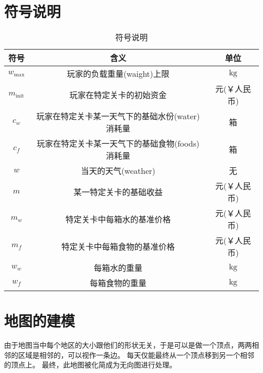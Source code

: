 \documentclass{cumcmthesis}
\begin{document}
\section{符号说明}
\begin{table}[H]
	\caption{符号说明}
	\centering
	\begin{tabular}{ccc}
		\toprule[1.5pt]
		符号                  & 含义                                                           & 单位          \\
		\midrule[1pt]
		$w_{\mathrm{max}}$    & \qquad\qquad\quad 玩家的负载重量(waight)上限\qquad\qquad\qquad & $\mathrm{kg}$ \\
		$ m_{\mathrm{init}} $ & 玩家在特定关卡的初始资金                                       & 元(￥人民币)  \\
		$ c_w $               & 玩家在特定关卡某一天气下的基础水份(water)消耗量                & 箱            \\
		$ c_f $               & 玩家在特定关卡某一天气下的基础食物(foods)消耗量                & 箱            \\
		$ w $                 & 当天的天气(weather)                                            & 无            \\
		$ m $                 & 某一特定关卡的基础收益                                         & 元(￥人民币)  \\
		$ m_w $               & 特定关卡中每箱水的基准价格                                     & 元(￥人民币)  \\
		$ m_f $               & 特定关卡中每箱食物的基准价格                                   & 元(￥人民币)  \\
		$ w_w $               & 每箱水的重量                                                   & $\mathrm{kg}$ \\
		$ w_f $               & 每箱食物的重量                                                 & $\mathrm{kg}$ \\
		\bottomrule[1.5pt]
	\end{tabular}
\end{table}



\newpage
\section{地图的建模}
由于地图当中每个地区的大小跟他们的形状无关，于是可以是做一个顶点，两两相邻的区域是相邻的，可以视作一条边。
每天仅能最终从一个顶点移到另一个相邻的顶点上。
最终，此地图被化简成为无向图进行处理。\par
\end{document}
